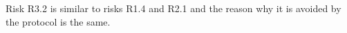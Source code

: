 Risk \textsf{R3.2} is similar to risks \textsf{R1.4} and \textsf{R2.1} and the reason why it is avoided by the protocol is the same.



%
%
%






%

